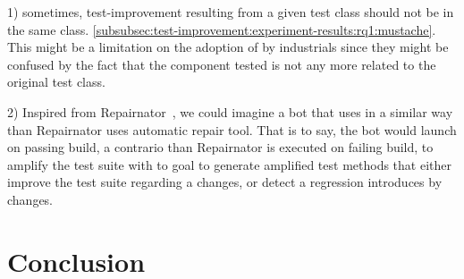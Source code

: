 1) sometimes, test-improvement resulting from a given test class should not be in the same class. \eg \autoref{subsubsec:test-improvement:experiment-results:rq1:mustache}.
This might be a limitation on the adoption of \dspot by industrials since they might be confused by the fact that the component tested is not any more related to the original test class.

2) Inspired from Repairnator~\cite{urli:hal-01691496}, we could imagine a bot that uses \dspot in a similar way than Repairnator uses automatic repair tool.
That is to say, the bot would launch \dspot on passing build, a contrario than Repairnator is executed on failing build, to amplify the test suite with to goal to generate amplified test methods that either improve the test suite regarding a changes, or detect a regression introduces by changes.

\section{Conclusion}
\label{sec:conclusion:conclusion}




